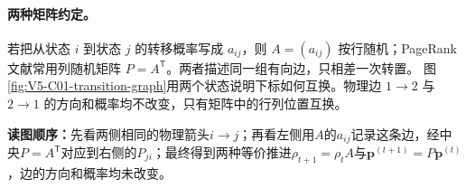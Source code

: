 \documentclass[UTF8,a4paper,11pt,openany]{ctexbook}
\begin{document}
\setcounter{page}{578}
\setcounter{chapter}{30}
\setcounter{figure}{1}
\pagestyle{headings}
\paragraph{两种矩阵约定。}若把从状态 $i$ 到状态 $j$ 的转移概率写成 $a_{ij}$，则 $A=(a_{ij})$ 按行随机；PageRank 文献常用列随机矩阵 $P=A^{\mathsf T}$。两者描述同一组有向边，只相差一次转置。
图\ref{fig:V5-C01-transition-graph}用两个状态说明下标如何互换。物理边 $1\to2$ 与 $2\to1$ 的方向和概率均不改变，只有矩阵中的行列位置互换。


\noindent\textbf{读图顺序：}先看两侧相同的物理箭头$i\to j$；再看左侧用$A$的$a_{ij}$记录这条边，经中央$P=A^{\mathsf T}$对应到右侧的$P_{ji}$；最终得到两种等价推进$\rho_{t+1}=\rho_tA$与$\boldsymbol p^{(t+1)}=P\boldsymbol p^{(t)}$，边的方向和概率均未改变。
\end{document}
